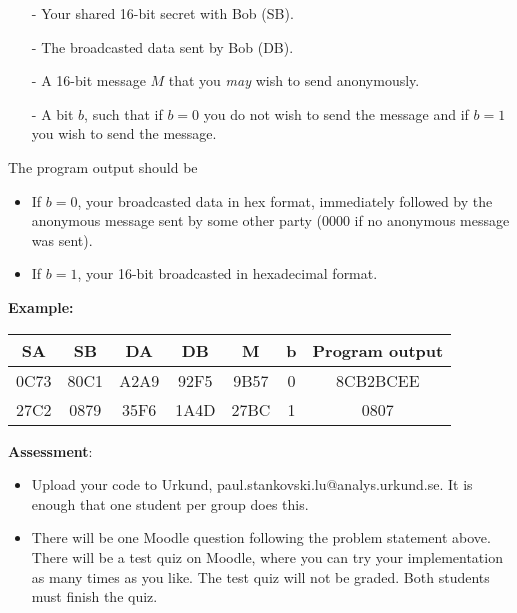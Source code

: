 \documentclass{article}
\begin{document}
\begin{description}
{\begin{itemize}
		\item[-] Your shared 16-bit secret with Bob (SB).
		\item[-] The broadcasted data sent by Bob (DB).
		\item[-] A 16-bit message $M$ that you \textit{may} wish to send anonymously.
		\item[-] A bit $b$, such that if $b=0$ you do not wish to send the message and if $b=1$ you wish to send the message.
	\end{itemize}
	The program output should be
	\begin{itemize}
	\item If $b=0$, your broadcasted data in hex format, immediately followed by the anonymous message sent by some other party (0000 if no anonymous message was sent).
	\item If $b=1$, your 16-bit broadcasted in hexadecimal format.
	\end{itemize}
	\textbf{Example:}\\
	\begin{center}
	\begin{tabular}{|c|c|c|c|c|c||c|}\hline
		\textbf{SA} & \textbf{SB} & \textbf{DA} & \textbf{DB} & \textbf{M} & \textbf{b} & \textbf{Program output}\\\hline
		0C73 & 80C1 & A2A9 & 92F5 & 9B57 & 0 & 8CB2BCEE\\\hline
		27C2 & 0879 & 35F6 & 1A4D & 27BC & 1 & 0807\\\hline
		
	\end{tabular}
	\end{center}
	\noindent\textbf{Assessment}:
	\begin{itemize}
		\item Upload your code to Urkund, paul.stankovski.lu@analys.urkund.se. It is enough that one student per group does this.
		\item There will be one Moodle question following the problem statement above.
		There will be a test quiz on Moodle, where you can try your implementation as many times as you like. The test quiz will not be graded. Both students must finish the quiz.
	\end{itemize}
	}
	

\end{description}
\end{document}
